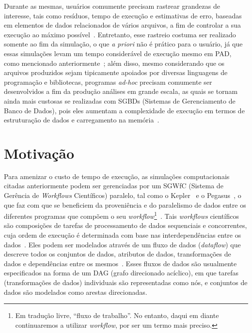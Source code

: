 Durante as mesmas, usuários comumente precisam rastrear grandezas de interesse, tais como resíduos, tempo de execução e estimativas de erro, baseadas em elementos de dados relacionados de vários arquivos, a fim de controlar a sua execução ao máximo possível~\cite{silva2016situ}.
Entretanto, esse rastreio costuma ser realizado somente ao fim da simulação, o que \textit{a priori} não é prático para o usuário, já que essas simulações levam um tempo considerável de execução mesmo em PAD, como mencionado anteriormente~\cite{silva2017raw}; além disso, mesmo considerando que os arquivos produzidos sejam tipicamente apoiados por diversas linguagens de programação e bibliotecas, programas \textit{ad-hoc} precisam comumente ser desenvolvidos a fim da produção análises em grande escala, as quais se tornam ainda mais custosas se realizadas com  SGBDs (Sistemas de Gerenciamento de Banco de Dados), pois eles aumentam a complexidade de execução em termos de estruturação de dados e carregamento na memória~\cite{silva2015analyzing}.

\section{Motivação}%
\label{sec:motivacao}

Para amenizar o custo de tempo de execução, as simulações computacionais citadas anteriormente podem ser gerenciadas por um  SGWfC (Sistema de Gerência de \textit{Workflows} Científicos) paralelo, tal como o Kepler~\cite{ludascher2006scientific} e o Pegasus~\cite{deelman2005pegasus}, o que faz com que se beneficiem da proveniência e do paralelismo de dados entre os diferentes programas que compõem o seu \textit{workflow}\footnote{Em tradução livre, ``fluxo de trabalho''. No entanto, daqui em diante continuaremos a utilizar \textit{workflow}, por ser um termo mais preciso.}~\cite{bux2013parallelization}.
Tais \textit{workflows} científicos são composições de tarefas de processamento de dados sequenciais e concorrentes, cuja ordem de execução é determinada com base nas interdependências entre os dados~\cite{bux2013parallelization}. Eles podem ser modelados através de um fluxo de dados (\textit{dataflow}) que descreve todos os conjuntos de dados, atributos de dados, transformações de dados e dependências entre os mesmos~\cite{silva2017raw}. Esses fluxos de dados são usualmente especificados na forma de um  DAG (grafo direcionado acíclico), em que tarefas (transformações de dados) individuais são representadas como nós, e conjuntos de dados são modelados como arestas direcionadas.

